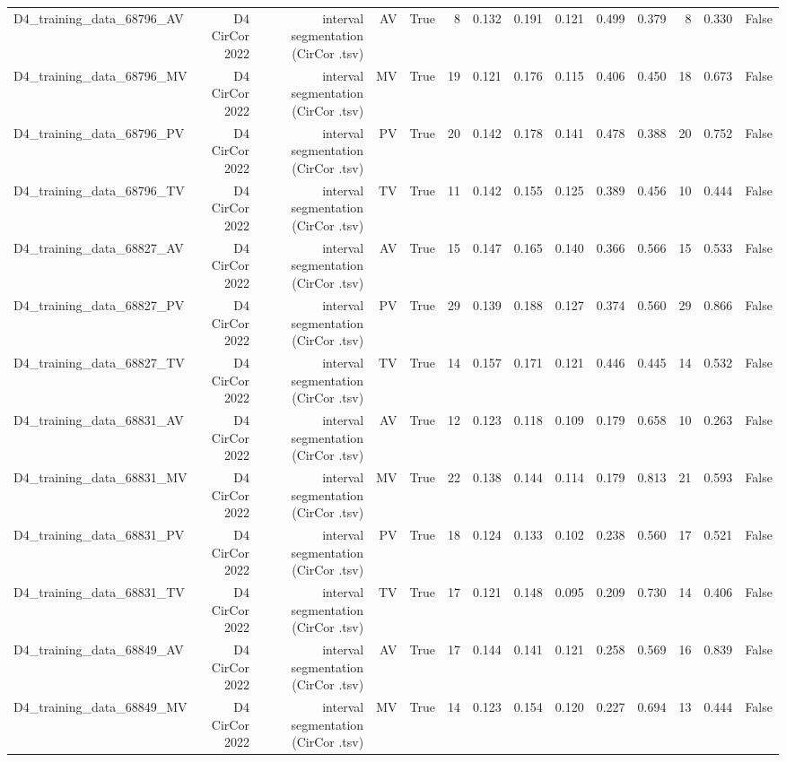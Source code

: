 \begin{table}[htbp]
\begin{tabular}{lrrrrrrrrrrrrr}
    D4\_training\_data\_68796\_AV & D4 CirCor 2022 & interval segmentation (CirCor .tsv) & AV & True & 8 & 0.132 & 0.191 & 0.121 & 0.499 & 0.379 & 8 & 0.330 & False \\
    D4\_training\_data\_68796\_MV & D4 CirCor 2022 & interval segmentation (CirCor .tsv) & MV & True & 19 & 0.121 & 0.176 & 0.115 & 0.406 & 0.450 & 18 & 0.673 & False \\
    D4\_training\_data\_68796\_PV & D4 CirCor 2022 & interval segmentation (CirCor .tsv) & PV & True & 20 & 0.142 & 0.178 & 0.141 & 0.478 & 0.388 & 20 & 0.752 & False \\
    D4\_training\_data\_68796\_TV & D4 CirCor 2022 & interval segmentation (CirCor .tsv) & TV & True & 11 & 0.142 & 0.155 & 0.125 & 0.389 & 0.456 & 10 & 0.444 & False \\
    D4\_training\_data\_68827\_AV & D4 CirCor 2022 & interval segmentation (CirCor .tsv) & AV & True & 15 & 0.147 & 0.165 & 0.140 & 0.366 & 0.566 & 15 & 0.533 & False \\
    D4\_training\_data\_68827\_PV & D4 CirCor 2022 & interval segmentation (CirCor .tsv) & PV & True & 29 & 0.139 & 0.188 & 0.127 & 0.374 & 0.560 & 29 & 0.866 & False \\
    D4\_training\_data\_68827\_TV & D4 CirCor 2022 & interval segmentation (CirCor .tsv) & TV & True & 14 & 0.157 & 0.171 & 0.121 & 0.446 & 0.445 & 14 & 0.532 & False \\
    D4\_training\_data\_68831\_AV & D4 CirCor 2022 & interval segmentation (CirCor .tsv) & AV & True & 12 & 0.123 & 0.118 & 0.109 & 0.179 & 0.658 & 10 & 0.263 & False \\
    D4\_training\_data\_68831\_MV & D4 CirCor 2022 & interval segmentation (CirCor .tsv) & MV & True & 22 & 0.138 & 0.144 & 0.114 & 0.179 & 0.813 & 21 & 0.593 & False \\
    D4\_training\_data\_68831\_PV & D4 CirCor 2022 & interval segmentation (CirCor .tsv) & PV & True & 18 & 0.124 & 0.133 & 0.102 & 0.238 & 0.560 & 17 & 0.521 & False \\
    D4\_training\_data\_68831\_TV & D4 CirCor 2022 & interval segmentation (CirCor .tsv) & TV & True & 17 & 0.121 & 0.148 & 0.095 & 0.209 & 0.730 & 14 & 0.406 & False \\
    D4\_training\_data\_68849\_AV & D4 CirCor 2022 & interval segmentation (CirCor .tsv) & AV & True & 17 & 0.144 & 0.141 & 0.121 & 0.258 & 0.569 & 16 & 0.839 & False \\
    D4\_training\_data\_68849\_MV & D4 CirCor 2022 & interval segmentation (CirCor .tsv) & MV & True & 14 & 0.123 & 0.154 & 0.120 & 0.227 & 0.694 & 13 & 0.444 & False \\

\end{tabular}
\end{table}
